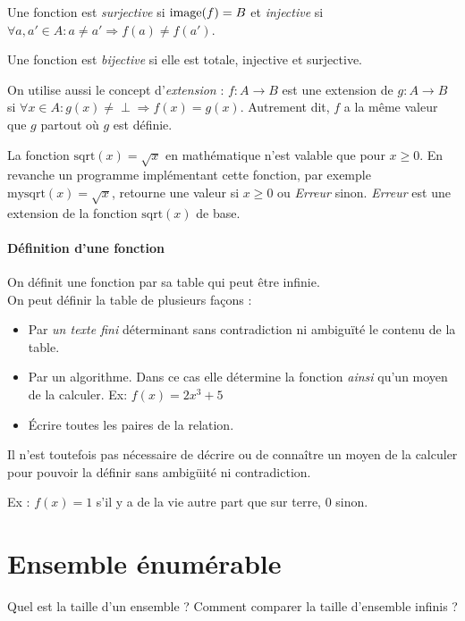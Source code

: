 Une fonction est \emph{surjective} si $\operatorname{image}(f) = B$ et \emph{injective} si $\forall a,a' \in A : a \neq a' \Rightarrow f(a) \neq f(a')$.

Une fonction est \emph{bijective} si elle est totale, injective et surjective.

On utilise aussi le concept d'\emph{extension} :
$f: A \rightarrow B$ est une extension de $g: A \rightarrow B$ si $\forall x \in A : g(x)\neq \perp \Rightarrow f(x) = g(x)$.
Autrement dit, $f$ a la même valeur que $g$ partout où $g$ est définie.

La fonction $\mathrm{sqrt}(x) = \sqrt{x}$ en mathématique n'est valable que pour $x\geq0$. En revanche un programme implémentant cette fonction, par exemple $\mathrm{mysqrt}(x) = \sqrt{x}$, retourne une valeur si $x\geq0$ ou \textit{Erreur} sinon. \textit{Erreur} est une extension de la fonction $\mathrm{sqrt}(x)$ de base.

\paragraph{Définition d'une fonction}
\label{par:d_finition_d_une_fonciton}
On définit une fonction par sa table qui peut être infinie.\\
On peut définir la table de plusieurs façons :
\begin{itemize}
	\item Par \emph{un texte fini} déterminant sans contradiction ni ambiguïté le contenu 
		de la table.
	\item Par un algorithme. Dans ce cas elle détermine la fonction \textit{ainsi} qu'un moyen de la calculer.
		\subitem Ex: $f(x) = 2x^3+5$
	\item Écrire toutes les paires de la relation.
\end{itemize}
Il n'est toutefois pas nécessaire de décrire ou de connaître un moyen de la calculer
pour pouvoir la définir sans ambigüité ni contradiction. 

Ex : $f(x) = 1$ s'il y a de la vie autre part que sur terre, $0$ sinon.

\section{Ensemble énumérable}
\label{sec:ensemble_num_rables}
Quel est la taille d'un ensemble ?  Comment comparer la taille d'ensemble infinis ?

